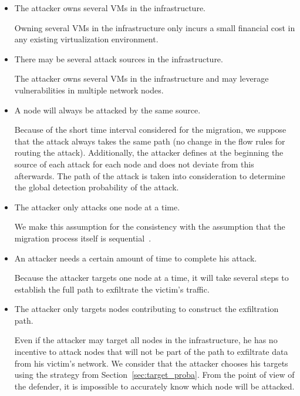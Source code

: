 \begin{itemize}
    \item The attacker owns several VMs in the infrastructure.
    
     Owning several VMs in the infrastructure only incurs a small financial cost in any existing virtualization environment.
 
    
    \item There may be several attack sources in the infrastructure.
    
    The attacker owns several VMs in the infrastructure and may leverage vulnerabilities in multiple network nodes.
    
    \item A node will always be attacked by the same source.
    
    Because of the short time interval considered for the migration, we suppose that the attack always takes the same path (\ie no change in the flow rules for routing the attack).
    Additionally, the attacker defines at the beginning the source of each attack for each node and does not deviate from this afterwards.
    The path of the attack is taken into consideration to determine the global detection probability of the attack.
    
    \item The attacker only attacks one node at a time.
    
    We make this assumption for the consistency with the assumption that the migration process itself is sequential~\cite{Lime-Ghorbani2014}.
    
    \item An attacker needs a certain amount of time to complete his attack.
    
    Because the attacker targets one node at a time, it will take several steps to establish the full path to exfiltrate the victim's traffic. 
    
    \item The attacker only targets nodes contributing to construct the exfiltration path.
    
     Even if the attacker may target all nodes in the infrastructure, he has no incentive to attack nodes that will not be part of the path to exfiltrate data from his victim's network. We consider that the attacker chooses his targets using the strategy from Section~\ref{sec:target_proba}.
    From the point of view of the defender, it is impossible to accurately know which node will be attacked.
    
\end{itemize}




